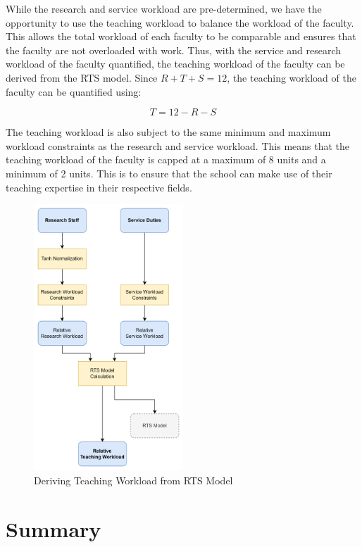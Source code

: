 While the research and service workload are pre-determined, we have the opportunity to use the teaching workload to balance the workload of the faculty. This allows the total workload of each faculty to be comparable and ensures that the faculty are not overloaded with work. Thus, with the service and research workload of the faculty quantified, the teaching workload of the faculty can be derived from the RTS model. Since $R + T + S = 12$, the teaching workload of the faculty can be quantified using:

\begin{equation}
  T = 12 - R - S
\end{equation}

The teaching workload is also subject to the same minimum and maximum workload constraints as the research and service workload. This means that the teaching workload of the faculty is capped at a maximum of 8 units and a minimum of 2 units. This is to ensure that the school can make use of their teaching expertise in their respective fields.


\begin{figure}[H]
  \includegraphics[width=0.5\textwidth]{images/faculty_wam.png}
  \centering
  \caption{Deriving Teaching Workload from RTS Model}
  \label{fig:faculty_wam}
\end{figure}


\section{Summary}

